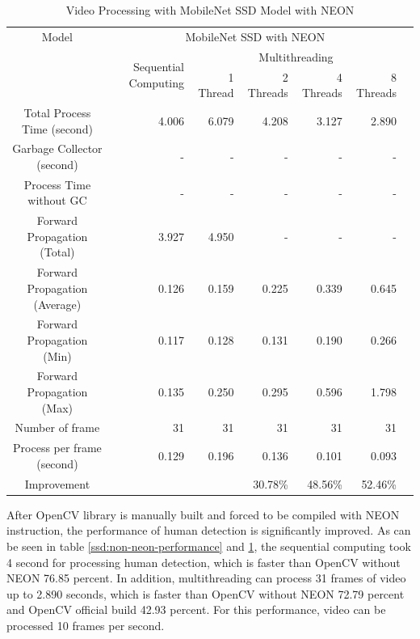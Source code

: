             \begin{table}[!htp]\centering
                \scriptsize
                \begin{tabular}{lrrrrrrr}\toprule
                    \multicolumn{2}{c}{Model} &\multicolumn{5}{c}{MobileNet SSD with NEON} \\\cmidrule{1-7}
                    \multicolumn{2}{c}{\multirow{2}{*}{}} &\multirow{2}{*}{Sequential Computing} &\multicolumn{4}{c}{Multithreading} \\\cmidrule{4-7}
                    & & &1 Thread &2 Threads &4 Threads &8 Threads \\\midrule
                    \multicolumn{2}{c}{Total Process Time (second)} &4.006 &6.079 &4.208 &3.127 &2.890 \\
                    \multicolumn{2}{c}{Garbage Collector (second)} &- &- &- &- &- \\
                    \multicolumn{2}{c}{Process Time without GC} &- &- &- &- &- \\
                    \multicolumn{2}{c}{Forward Propagation (Total)} &3.927 &4.950 &- &- &- \\
                    \multicolumn{2}{c}{Forward Propagation (Average)} &0.126 &0.159 &0.225 &0.339 &0.645 \\
                    \multicolumn{2}{c}{Forward Propagation (Min)} &0.117 &0.128 &0.131 &0.190 &0.266 \\
                    \multicolumn{2}{c}{Forward Propagation (Max)} &0.135 &0.250 &0.295 &0.596 &1.798 \\
                    \multicolumn{2}{c}{Number of frame} &31 &31 &31 &31 &31 \\
                    \multicolumn{2}{c}{Process per frame (second)} &0.129 &0.196 &0.136 &0.101 &0.093 \\
                    \multicolumn{2}{c}{Improvement} & & &30.78\% &48.56\% &52.46\% \\
                    \bottomrule
                \end{tabular}

                \caption{Video Processing with MobileNet SSD Model with NEON}\label{ssd:neon-performance}
            \end{table}

            After OpenCV library is manually built and forced to be compiled with NEON instruction,
            the performance of human detection is significantly improved.
            As can be seen in table \ref{ssd:non-neon-performance} and \ref{ssd:neon-performance},
            the sequential computing took 4 second for processing human detection,
            which is faster than OpenCV without NEON 76.85 percent.
            In addition, multithreading can process 31 frames of video up to 2.890 seconds,
            which is faster than OpenCV without NEON 72.79 percent and OpenCV official build 42.93 percent.
            For this performance, video can be processed 10 frames per second.

